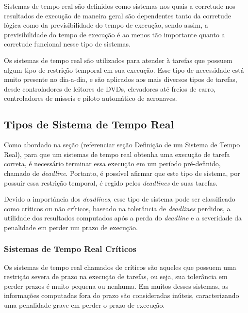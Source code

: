 Sistemas de tempo real são definidos como sistemas nos quais a corretude nos
resultados de execução de maneira geral são dependentes tanto da corretude
lógica como da previsibilidade do tempo de execução, sendo assim, a previsibilidade
do tempo de execução é ao menos tão importante quanto a corretude funcional
nesse tipo de sistemas.~\cite{Li:2003:RCE:829584}

Os sistemas de tempo real são utilizados para atender à tarefas que possuem algum tipo
de restrição temporal em sua execução. Esse tipo de necessidade está muito presente no
dia-a-dia, e são aplicados aos mais diversos tipos de tarefas, desde controladores de
leitores de DVDs, elevadores até freios de carro, controladores de mísseis e piloto automático
de aeronaves.

\subsection{Tipos de Sistema de Tempo Real}
Como abordado na seção (referenciar seção Definição de um Sistema de Tempo Real),
para que um sistemas de tempo real obtenha uma execução de tarefa correta,
é necessário terminar essa execução em um período pré-definido, chamado de \textit{deadline}.
Portanto, é possível afirmar que este tipo de sistema, por possuir essa restrição temporal,
é regido pelos \textit{deadlines} de suas tarefas.

Devido a importância dos \textit{deadlines}, esse tipo de sistema pode ser classificado como
críticos ou não críticos, baseado na tolerância de \textit{deadlines} perdidos, a utilidade
dos resultados computados após a perda do \textit{deadline} e a severidade da penalidade em
perder um prazo de execução.

\subsubsection{Sistemas de Tempo Real Críticos}
Os sistemas de tempo real chamados de críticos são aqueles que possuem uma restrição severa
de prazo na execução de tarefas, ou seja, sua tolerância em perder prazos é muito pequena
ou nenhuma. Em muitos desses sistemas, as informações computadas fora do prazo são consideradas
inúteis, caracterizando uma penalidade grave em perder o prazo de execução.

